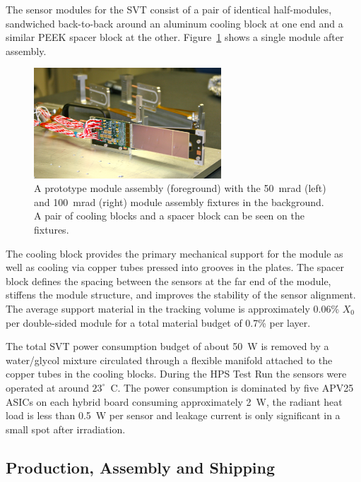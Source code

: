 \documentclass[final,3p,times,twocolumn]{elsarticle}
\begin{document}
The sensor modules for the SVT consist of a pair of identical half-modules, sandwiched back-to-back 
around an aluminum cooling block at one end and a similar PEEK spacer block at the other. 
Figure~\ref{fig:tracker_module} shows a single module after assembly.
\begin{figure}[htp]
	\begin{center}
   	 \includegraphics[width=7cm]{IMG_5200}
	\caption{\small A prototype module assembly (foreground) with the 50~mrad (left) and 100~mrad (right) module assembly fixtures in the background.  A pair of cooling blocks and a spacer block can be seen on the fixtures.
\label{fig:tracker_module}}
\end{center}
\end{figure}
The cooling block provides the primary mechanical support for the module as well as cooling via copper 
tubes pressed into grooves in the plates. The spacer block defines the spacing between the sensors at 
the far end of the module, stiffens the module structure, and improves the stability of the sensor 
alignment.  The average support material in the tracking volume is approximately 0.06\% $X_{0}$ per 
double-sided module for a total material budget of 0.7\% per layer.

The total SVT power consumption budget of about 50~W is removed by a water/glycol mixture 
circulated through a flexible manifold attached to the copper tubes in the cooling blocks. During the 
HPS Test Run the sensors were operated at around $23^{\circ}$~C. The power consumption is 
dominated by five 
APV25 ASICs on each hybrid board consuming approximately 2~W, the radiant heat load is less than 
0.5~W per sensor and leakage current is only significant in a small spot after irradiation.  







\subsection{Production, Assembly and Shipping}
\end{document}
